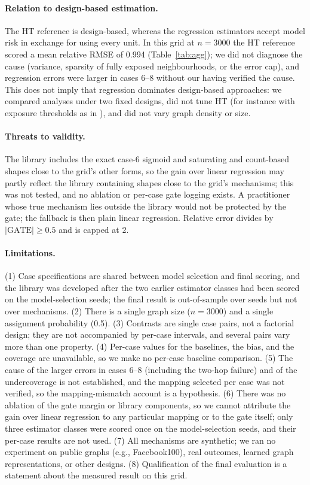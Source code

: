 \documentclass{article}
\newcommand{\gate}{\mathrm{GATE}}
\begin{document}
\paragraph{Relation to design-based estimation.} The HT reference is design-based, whereas the regression estimators accept model risk in exchange for using every unit. In this grid at $n=3000$ the HT reference scored a mean relative RMSE of 0.994 (Table~\ref{tab:agg}); we did not diagnose the cause (variance, sparsity of fully exposed neighbourhoods, or the error cap), and regression errors were larger in cases 6--8 without our having verified the cause. This does not imply that regression dominates design-based approaches: we compared analyses under two fixed designs, did not tune HT (for instance with exposure thresholds as in \citealp{Thiyageswaran2024DataAdaptive}), and did not vary graph density or size. %

\paragraph{Threats to validity.} The library includes the exact case-6 sigmoid and saturating and count-based shapes close to the grid's other forms, so the gain over linear regression may partly reflect the library containing shapes close to the grid's mechanisms; this was not tested, and no ablation or per-case gate logging exists. A practitioner whose true mechanism lies outside the library would not be protected by the gate; the fallback is then plain linear regression. Relative error divides by $|\gate|\ge0.5$ and is capped at 2.

\paragraph{Limitations.} (1) Case specifications are shared between model selection and final scoring, and the library was developed after the two earlier estimator classes had been scored on the model-selection seeds; the final result is out-of-sample over seeds but not over mechanisms. (2) There is a single graph size ($n=3000$) and a single assignment probability (0.5). (3) Contrasts are single case pairs, not a factorial design; they are not accompanied by per-case intervals, and several pairs vary more than one property. (4) Per-case values for the baselines, the bias, and the coverage are unavailable, so we make no per-case baseline comparison. (5) The cause of the larger errors in cases 6--8 (including the two-hop failure) and of the undercoverage is not established, and the mapping selected per case was not verified, so the mapping-mismatch account is a hypothesis. (6) There was no ablation of the gate margin or library components, so we cannot attribute the gain over linear regression to any particular mapping or to the gate itself; only three estimator classes were scored once on the model-selection seeds, and their per-case results are not used. (7) All mechanisms are synthetic; we ran no experiment on public graphs (e.g., Facebook100), real outcomes, learned graph representations, or other designs. (8) Qualification of the final evaluation is a statement about the measured result on this grid.
\end{document}
